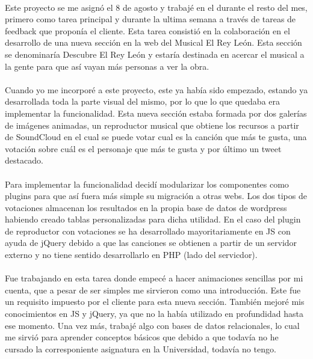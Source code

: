 \documentclass[10pt, a4paper,spanish]{article}
\begin{document}
                \paragraph{}
                Este proyecto se me asignó el 8 de agosto y trabajé en el durante el resto del mes, primero como tarea principal y durante la ultima semana a través de tareas de feedback que proponía el cliente. Esta tarea consistió en la colaboración en el desarrollo de una nueva sección en la web del Musical El Rey León. Esta sección se denominaría Descubre El Rey León y estaría destinada en acercar el musical a la gente para que así vayan más personas a ver la obra.

                \paragraph{}
                Cuando yo me incorporé a este proyecto, este ya había sido empezado, estando ya desarrollada toda la parte visual del mismo, por lo que lo que quedaba era implementar la funcionalidad. Esta nueva sección estaba formada por dos galerías  de imágenes animadas, un reproductor musical que obtiene los recursos a partir de SoundCloud en el cual se puede votar cual es la canción que más te gusta, una votación sobre cuál es el personaje que más te gusta y por último un tweet destacado.

                \paragraph{}
                Para implementar la funcionalidad decidí modularizar los componentes como plugins para que así fuera más simple su migración a otras webs. Los dos tipos de votaciones almacenan los resultados en la propia base de datos de wordpress habiendo creado tablas personalizadas para dicha utilidad. En el caso del plugin de reproductor con votaciones se ha desarrollado mayoritariamente en JS con ayuda de jQuery debido a que las canciones se obtienen a partir de un servidor externo y no tiene sentido desarrollarlo en PHP (lado del servicdor).

                \paragraph{}
                Fue trabajando en esta tarea donde empecé a hacer animaciones sencillas por mi cuenta, que a pesar de ser simples me sirvieron como una introducción. Este fue un requisito impuesto por el cliente para esta nueva sección. También mejoré mis conocimientos en JS y jQuery, ya que no la había utilizado en profundidad hasta ese momento. Una vez más, trabajé algo con bases de datos relacionales, lo cual me sirvió para aprender conceptos básicos que debido a que todavía no he cursado la corresponiente asignatura en la Universidad, todavía no tengo.
\end{document}
